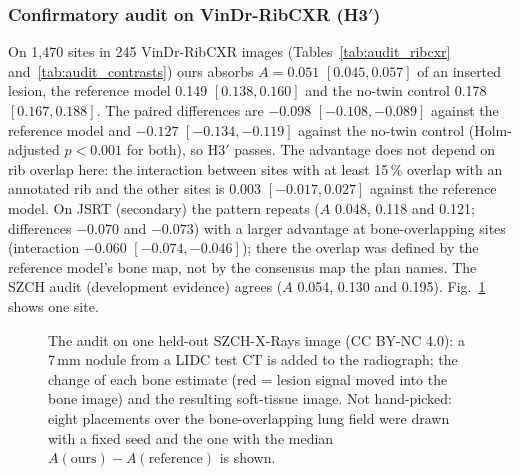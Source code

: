 \subsubsection{Confirmatory audit on VinDr-RibCXR (H3$'$)}
On 1,470 sites in 245 VinDr-RibCXR images (Tables~\ref{tab:audit_ribcxr} and~\ref{tab:audit_contrasts}) ours absorbs $A=0.051$
$[0.045,0.057]$ of an inserted lesion, the reference model 0.149 $[0.138,0.160]$ and the no-twin control 0.178 $[0.167,0.188]$. The paired
differences are $-0.098$ $[-0.108,-0.089]$ against the reference model and $-0.127$ $[-0.134,-0.119]$ against the no-twin control
(Holm-adjusted $p<0.001$ for both), so H3$'$ passes. The advantage does not depend on rib overlap here: the interaction between sites with at
least 15\,\% overlap with an annotated rib and the other sites is $0.003$ $[-0.017,0.027]$ against the reference model. On JSRT (secondary)
the pattern repeats ($A$ 0.048, 0.118 and 0.121; differences $-0.070$ and $-0.073$) with a larger advantage at bone-overlapping sites
(interaction $-0.060$ $[-0.074,-0.046]$); there the overlap was defined by the reference model's bone map, not by the consensus map the plan
names. The SZCH audit (development evidence) agrees ($A$ 0.054, 0.130 and 0.195). Fig.~\ref{fig:audit_maps} shows one site.

\begin{table}[!t]
\centering
\caption{Counterfactual lesion audit on VinDr-RibCXR: mean absorption per method with image-cluster bootstrap intervals (lower is
better).}
\label{tab:audit_ribcxr}
\end{table}

\begin{table}[!t]
\centering
\caption{H3$'$ paired site-level contrasts on the three audit sets, Holm over the two contrasts, and the interaction with bone overlap
($\geq$15\,\% vs.\ $<$15\,\%). SZCH rows: the 51 held-out images (306 sites), still development evidence because the audit on all 75 images
was used during development; the JSRT overlap comes from the reference model's bone map.}
\label{tab:audit_contrasts}
\end{table}

\begin{figure}[!t]
\centering
{}
\caption{The audit on one held-out SZCH-X-Rays image (CC BY-NC 4.0): a 7\,mm nodule from a LIDC test CT is added to the radiograph; the
change of each bone estimate (red = lesion signal moved into the bone image) and the resulting soft-tissue image. Not hand-picked: eight
placements over the bone-overlapping lung field were drawn with a fixed seed and the one with the median $A(\text{ours})-A(\text{reference})$
is shown.}
\label{fig:audit_maps}
\end{figure}

